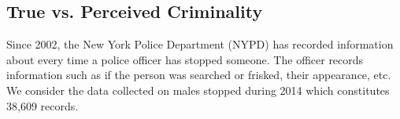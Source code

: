 
 










\subsection{True vs. Perceived Criminality}
\label{sec:true-vs.-perceived}
Since 2002, the New York Police Department (NYPD) has recorded
information about every time a police officer has stopped someone. The
officer records information such as if the person was searched or
frisked, %
their appearance, %
etc. We
consider the data collected on males stopped during 2014 which constitutes 38,609 records. %

